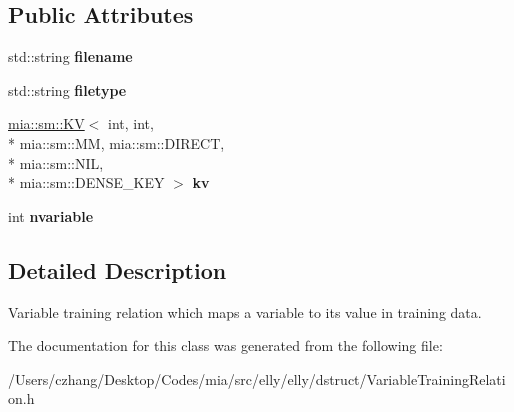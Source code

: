 \subsection*{Public Attributes}
\begin{DoxyCompactItemize}
\item 
\hypertarget{classmia_1_1elly_1_1dstruct_1_1_variable_training_relation_a21a386fd538d32997490bfdfaf16e89c}{std\-::string {\bfseries filename}}\label{classmia_1_1elly_1_1dstruct_1_1_variable_training_relation_a21a386fd538d32997490bfdfaf16e89c}

\item 
\hypertarget{classmia_1_1elly_1_1dstruct_1_1_variable_training_relation_a9a73ac31be32e3f0cc18785c841e78c1}{std\-::string {\bfseries filetype}}\label{classmia_1_1elly_1_1dstruct_1_1_variable_training_relation_a9a73ac31be32e3f0cc18785c841e78c1}

\item 
\hypertarget{classmia_1_1elly_1_1dstruct_1_1_variable_training_relation_adf9ee27ce1d35a996a2b01ae8251cb79}{\hyperlink{classmia_1_1sm_1_1_k_v}{mia\-::sm\-::\-K\-V}$<$ int, int, \\*
mia\-::sm\-::\-M\-M, mia\-::sm\-::\-D\-I\-R\-E\-C\-T, \\*
mia\-::sm\-::\-N\-I\-L, \\*
mia\-::sm\-::\-D\-E\-N\-S\-E\-\_\-\-K\-E\-Y $>$ {\bfseries kv}}\label{classmia_1_1elly_1_1dstruct_1_1_variable_training_relation_adf9ee27ce1d35a996a2b01ae8251cb79}

\item 
\hypertarget{classmia_1_1elly_1_1dstruct_1_1_variable_training_relation_ac651af7167f73bfbc51fa6c940562d52}{int {\bfseries nvariable}}\label{classmia_1_1elly_1_1dstruct_1_1_variable_training_relation_ac651af7167f73bfbc51fa6c940562d52}

\end{DoxyCompactItemize}


\subsection{Detailed Description}
Variable training relation which maps a variable to its value in training data. 

The documentation for this class was generated from the following file\-:\begin{DoxyCompactItemize}
\item 
/\-Users/czhang/\-Desktop/\-Codes/mia/src/elly/elly/dstruct/Variable\-Training\-Relation.\-h\end{DoxyCompactItemize}
